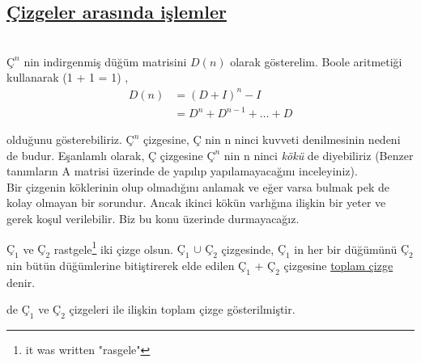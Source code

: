 \documentclass{amsbook}
\begin{document}
    \subsection{\underline{Çizgeler arasında işlemler \hspace{3.4 in}}\\}\\
    
    $Ç^{n}$ nin indirgenmiş düğüm matrisini $D(n)$ olarak gösterelim. Boole aritmetiği kullanarak (1 + 1 = 1) , \\
    \begin{align*}
        D(n) &= ( D + I )^{n} - I \\
        &= D^{n} + D^{n-1} + \dots + D 
    \end{align*}
    
    olduğunu gösterebiliriz. $Ç^{n}$ çizgesine, Ç nin n ninci kuvveti denilmesinin nedeni de budur. Eşanlamlı olarak, Ç çizgesine $Ç^{n}$ nin n ninci \textit{kökü} de diyebiliriz (Benzer tanımların A matrisi üzerinde de yapılıp yapılamayacağını inceleyiniz).\\
    
    Bir çizgenin köklerinin olup olmadığını anlamak ve eğer varsa bulmak pek de kolay olmayan bir sorundur. Ancak ikinci kökün varlığına ilişkin bir yeter ve gerek koşul verilebilir. Biz bu konu üzerinde durmayacağız. \\
    
    \begin{definition} \label{first}
        $Ç_1$ ve $Ç_2$ rastgele\footnote{it was written "rasgele"} iki çizge olsun. $Ç_1$ $\cup$ $Ç_2$ çizgesinde, $Ç_1$ in her bir düğümünü $Ç_2$ nin bütün düğümlerine bitiştirerek elde edilen $Ç_1$ + $Ç_2$ çizgesine \underline{toplam çizge} denir.
    \end{definition}
    
    de $Ç_1$ ve $Ç_2$ çizgeleri ile ilişkin toplam çizge gösterilmiştir.    
\end{document}
